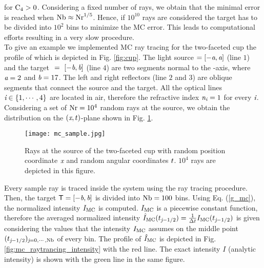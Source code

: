 for $\textrm{C}_4>0$.
Considering a fixed number of rays, we obtain that the minimal error is reached when $\textrm{Nb}\approx \textrm{Nr}^{1/5}$.
Hence, if $10^{10}$ rays are considered the target has to be divided into $10^2$ bins to minimize the MC error.
This leads to computational efforts resulting in a very slow procedure.\\ \indent
To give an example we implemented MC ray tracing for the two-faceted cup the profile of which is depicted in Fig. \ref{fig:cup}. 
The light source $= [-\textit{a}, \textit{a}]$ (line $1$) and the target $~=~ [-\textit{b}, \textit{b}]$ (line $4$) are two segments normal to the -axis, where $\textit{a}=2$ and $\textit{b}=17$.
The left and right reflectors (line $2$ and $3$) are oblique segments that connect the source and the target.
All the optical lines $\textit{i} \in \{1, \cdots, 4\}$  are located in air, therefore the refractive index $\textit{n}_{\textit{i}}=1$ for every $\textit{i}$.
Considering a set of $\textrm{Nr} = 10^4$ random rays 
at the source, we obtain the distribution on the $(\textit{x}, t)$-plane shown in Fig. \ref{fig:mc_sample}.
\begin{figure}[h]
\begin{center}
    \texttt{[image: mc\_sample.jpg]}
    \caption{Rays at the source of the two-faceted cup with random position coordinate $\textit{x}$ and random angular coordinates $t$. $10^4$ rays are depicted in this figure.}
    \label{fig:mc_sample}
\end{center}
  \end{figure}
Every sample ray is traced inside the system using the ray tracing procedure. Then, the target $\textsf{T} = [-\textit{b}, \textit{b}]$ is divided into $\textrm{Nb}= 100$ bins.
Using Eq. (\ref{g_mc}), the normalized intensity $I_{\textrm{MC}}$ is computed. $I_{\textrm{MC}}$  is a piecewise constant function, therefore the averaged normalized intensity  $\hat{I}_{\textrm{MC}}(t_{\textit{j}-1/2})= \frac{1}{\Delta t}I_{\textrm{MC}}(t_{\textit{j}-1/2})$ is given considering the values that the intensity  $I_{\textrm{MC}}$ assumes on the middle point $(t_{\textit{j}-1/2})_{\textit{j} = 0, \cdots, \textrm{Nb}}$ of every bin. The profile of $\hat{I}_{\textrm{MC}}$ is depicted in Fig. \ref{fig:mc_raytrancing_intensity} with the red line. The exact intensity $I$ (analytic intensity) is shown with the green line in the same figure.
